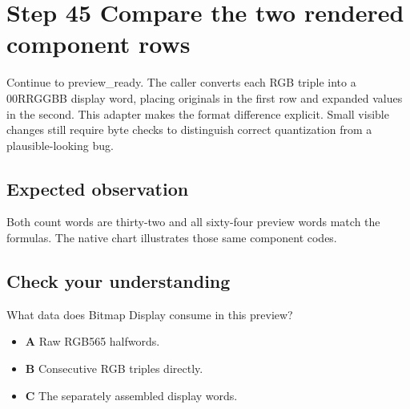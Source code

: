 \section{Step 45 Compare the two rendered component rows}\label{rgb-s45}

Continue to preview\_ready. The caller converts each RGB triple into a 00RRGGBB display word, placing originals in the first row and expanded values in the second. This adapter makes the format difference explicit. Small visible changes still require byte checks to distinguish correct quantization from a plausible-looking bug.

\subsection{Expected observation}
Both count words are thirty-two and all sixty-four preview words match the formulas. The native chart illustrates those same component codes.

\subsection{Check your understanding}
What data does Bitmap Display consume in this preview?

\begin{itemize}
  \item \textbf{A} Raw RGB565 halfwords.
  \item \textbf{B} Consecutive RGB triples directly.
  \item \textbf{C} The separately assembled display words.
\end{itemize}
